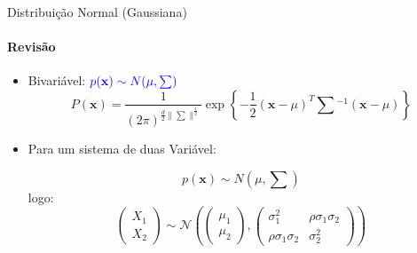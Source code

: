 \documentclass[aspectratio=169]{beamer}
\begin{document}
\begin{frame}{Distribuição Normal (Gaussiana)}
    \framesubtitle{Revisão}
    \begin{itemize}
        \item Bivariável: $\color{blue}{p(\mathbf{x}) \sim N(\mu, \textstyle\sum)}$
    \begin{equation*}
        P(\mathbf{x}) = \frac{1}{(2\pi)^{\frac{d}{2}\|\textstyle\sum\|^{\frac{1}{2}}}}\exp\left\{-\frac{1}{2} (\mathbf{x}-\mu)^T\textstyle\sum{}^{-1}(\mathbf{x}-\mu)\right\}
    \end{equation*}
    
    \item Para um sistema de duas Variável:
    
    \begin{equation*}
        p(\mathbf{x}) \sim N(\mu, \textstyle\sum)
    \end{equation*}
    logo:     
    \begin{equation*}
        \begin{pmatrix}
            X_1 \\
            X_2
        \end{pmatrix}  \sim \mathcal{N} \left( \begin{pmatrix}
            \mu_1 \\
            \mu_2
        \end{pmatrix} , \begin{pmatrix}
            \sigma^2_1 &  \rho \sigma_1 \sigma_2 \\
            \rho \sigma_1 \sigma_2 &  \sigma^2_2
        \end{pmatrix} \right)
    \end{equation*}
    \end{itemize}
\end{frame}
\end{document}
